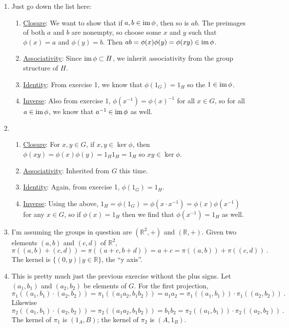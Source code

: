\documentclass[]{article}
\newcommand{\bbr}{\mathbb{R}}
\newcommand{\im}{\text{im\,}}
\begin{document}
\begin{enumerate}
\item Just go down the list here:
\begin{enumerate}
\item \underline{Closure}: We want to show that if $a, b \in \im\phi$, then so is $ab$. The preimages of both $a$ and $b$ are nonempty, so choose some $x$ and $y$ such that $\phi(x) = a$ and $\phi(y) = b$. Then $ab = \phi(x)\phi(y) = \phi(xy) \in \im\phi$.
\item \underline{Associativity}: Since $\im\phi \subset H$, we inherit associativity from the group structure of $H$.
\item \underline{Identity}: From exercise 1, we know that $\phi(1_G) = 1_H$ so the $1 \in \im\phi$.
\item \underline{Inverse}: Also from exercise 1, $\phi(x^{-1}) = \phi(x)^{-1}$ for all $x \in G$, so for all $a \in \im\phi$, we know that $a^{-1} \in \im\phi$ as well.
\end{enumerate}


\item \begin{enumerate}
\item \underline{Closure}: For $x,y \in G$, if $x,y \in \ker \phi$, then $\phi(xy) = \phi(x)\phi(y) = 1_H 1_H = 1_H$ so $xy \in \ker \phi$.
\item \underline{Associativity}: Inherited from $G$ this time.
\item \underline{Identity}: Again, from exercise 1, $\phi(1_G) = 1_H$.
\item \underline{Inverse}: Using the above, $1_H = \phi(1_G) = \phi(x\cdot x^{-1}) = \phi(x)\phi(x^{-1})$ for any $x \in G$, so if $\phi(x) = 1_H$ then we find that $\phi(x^{-1}) = 1_H$ as well.
\end{enumerate}


\item I'm assuming the groups in question are $(\bbr^2, +)$ and $(\bbr, +)$. Given two elements $(a,b)$ and $(c,d)$ of $\bbr^2$,
\begin{equation}
\pi((a,b)+(c,d)) = \pi((a+c,b+d)) = a+c = \pi((a,b)) + \pi((c,d))\ .
\end{equation}
The kernel is $\{(0,y)\,\vert\, y\in\bbr \}$, the ``y axis''.


\item This is pretty much just the previous exercise without the plus signs. Let $(a_1,b_1)$ and $(a_2,b_2)$ be elements of $G$. For the first projection,
\begin{equation}
\pi_1((a_1,b_1)\cdot(a_2,b_2)) = \pi_1((a_1a_2,b_1b_2)) = a_1a_2 = \pi_1((a_1,b_1))\cdot\pi_1((a_2,b_2))\ .
\end{equation}
Likewise
\begin{equation}
\pi_2((a_1,b_1)\cdot(a_2,b_2)) = \pi_2((a_1a_2,b_1b_2)) = b_1b_2 = \pi_2((a_1,b_1))\cdot\pi_2((a_2,b_2))\ .
\end{equation}
The kernel of $\pi_1$ is $(1_A,B)$; the kernel of $\pi_2$ is $(A,1_B)$.



\end{enumerate}
\end{document}
